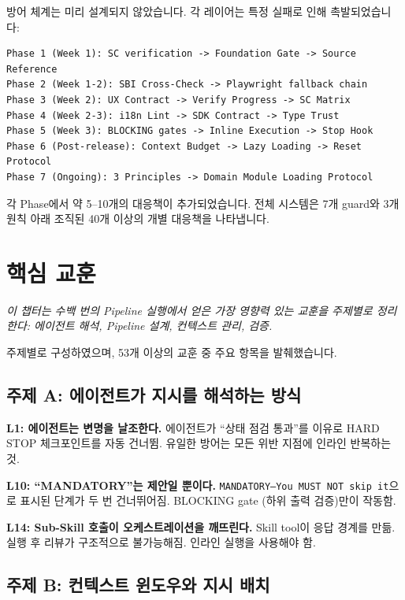 \documentclass[11pt,a4paper,openright,twoside]{report}
\begin{document}
방어 체계는 미리 설계되지 않았습니다. 각 레이어는 특정 실패로 인해 촉발되었습니다:

\begin{lstlisting}[title={Defense Evolution}]
Phase 1 (Week 1): SC verification -> Foundation Gate -> Source Reference
Phase 2 (Week 1-2): SBI Cross-Check -> Playwright fallback chain
Phase 3 (Week 2): UX Contract -> Verify Progress -> SC Matrix
Phase 4 (Week 2-3): i18n Lint -> SDK Contract -> Type Trust
Phase 5 (Week 3): BLOCKING gates -> Inline Execution -> Stop Hook
Phase 6 (Post-release): Context Budget -> Lazy Loading -> Reset Protocol
Phase 7 (Ongoing): 3 Principles -> Domain Module Loading Protocol
\end{lstlisting}

각 Phase에서 약 5--10개의 대응책이 추가되었습니다. 전체 시스템은 7개 guard와 3개 원칙 아래 조직된 40개 이상의 개별 대응책을 나타냅니다.


\chapter{핵심 교훈}
\label{ch:lessons}

\textit{이 챕터는 수백 번의 Pipeline 실행에서 얻은 가장 영향력 있는 교훈을 주제별로 정리한다: 에이전트 해석, Pipeline 설계, 컨텍스트 관리, 검증.}

주제별로 구성하였으며, 53개 이상의 교훈 중 주요 항목을 발췌했습니다.

\section{주제 A: 에이전트가 지시를 해석하는 방식}

\textbf{L1: 에이전트는 변명을 날조한다.} 에이전트가 ``상태 점검 통과''를 이유로 HARD STOP 체크포인트를 자동 건너뜀. 유일한 방어는 모든 위반 지점에 인라인 반복하는 것.

\textbf{L10: ``MANDATORY''는 제안일 뿐이다.} \texttt{MANDATORY---You MUST NOT skip it}으로 표시된 단계가 두 번 건너뛰어짐. BLOCKING gate (하위 출력 검증)만이 작동함.

\textbf{L14: Sub-Skill 호출이 오케스트레이션을 깨뜨린다.} Skill tool이 응답 경계를 만듦. 실행 후 리뷰가 구조적으로 불가능해짐. 인라인 실행을 사용해야 함.

\section{주제 B: 컨텍스트 윈도우와 지시 배치}
\end{document}
